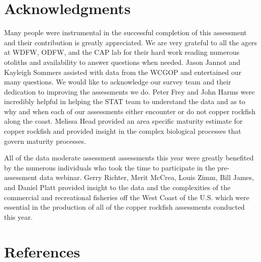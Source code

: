 \documentclass[11pt,
  english,
  a4paper,
]{article}
\begin{document}

\hypertarget{acknowledgments}{%
\section{Acknowledgments}\label{acknowledgments}}

\leavevmode\tagmcend\tagstructend


Many people were instrumental in the successful completion of this assessment and their contribution is greatly appreciated. We are very grateful to all the agers at WDFW, ODFW, and the CAP lab for their hard work reading numerous otoliths and availability to answer questions when needed. Jason Jannot and Kayleigh Sommers assisted with data from the WCGOP and entertained our many questions. We would like to acknowledge our survey team and their dedication to improving the assessments we do. Peter Frey and John Harms were incredibly helpful in helping the STAT team to understand the data and as to why and when each of our assessments either encounter or do not copper rockfish along the coast. Melissa Head provided an area specific maturity estimate for copper rockfish and provided insight in the complex biological processes that govern maturity processes.

\leavevmode\tagmcend\tagstructend\par


All of the data moderate assessment assessments this year were greatly benefited by the numerous individuals who took the time to participate in the pre-assessment data webinar. Gerry Richter, Merit McCrea, Louis Zimm, Bill James, and Daniel Platt provided insight to the data and the complexities of the commercial and recreational fisheries off the West Coast of the U.S. which were essential in the production of all of the copper rockfish assessments conducted this year.

\leavevmode\tagmcend\tagstructend\par

\clearpage


\hypertarget{references}{%
\section{References}\label{references}}
\end{document}

